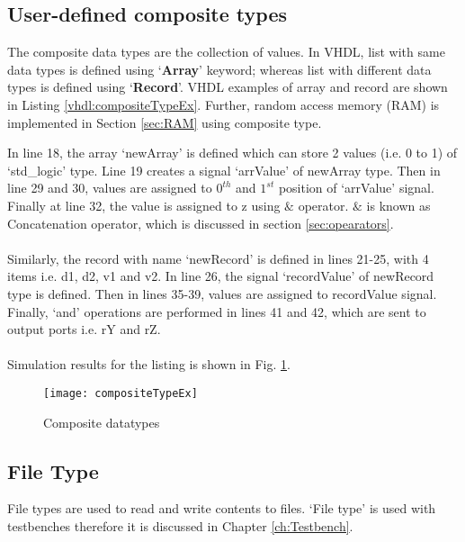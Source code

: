 


\subsection{User-defined composite types}\label{compsiteTypes}
The composite data types are the collection of values. In VHDL, list with same data types is defined using `\textbf{Array}' keyword; whereas list with different data types is defined using `\textbf{Record}'. VHDL examples of array and record are shown in Listing \ref{vhdl:compositeTypeEx}. Further, random access memory (RAM) is implemented in Section \ref{sec:RAM} using composite type. 

\begin{explanation}
	In line 18, the array `newArray' is defined which can store 2 values (i.e. 0 to 1) of `std\_logic' type. Line 19 creates a signal `arrValue' of newArray type. Then in line 29 and 30, values are assigned to $0^{th}$ and $1^{st}$ position of `arrValue' signal. Finally at line 32, the value is assigned to z using $\&$ operator. $\&$ is known as Concatenation operator, which is discussed in section \ref{sec:opearators}.
	\\ \\
	Similarly, the record with name `newRecord' is defined in lines 21-25, with 4 items i.e. d1, d2, v1 and v2. In line 26, the signal `recordValue' of newRecord type is defined. Then in lines 35-39, values are assigned to recordValue signal. Finally, `and' operations are performed in lines 41 and 42, which are sent to output ports i.e. rY and rZ. 
	\\ \\
	Simulation results for the listing is shown in Fig. \ref{fig:compositeTypeEx}. 
\end{explanation}


\begin{figure}[!h]
	\centering
	\texttt{[image: compositeTypeEx]}
	\caption{Composite datatypes}
	\label{fig:compositeTypeEx}
\end{figure}


\subsection{File Type} 
File types are used to read and write contents to files. `File type' is used with testbenches therefore it is discussed in Chapter \ref{ch:Testbench}.


